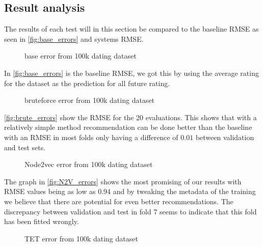 \subsection{Result analysis}
The results of each test will in this section be compared to the baseline RMSE as seen in \autoref{fig:base_errors} and systems RMSE.
\begin{figure}[H]
	\centering
	\begin{adjustbox}{width=0.5\textwidth}
		
	\end{adjustbox}
	\caption{base error from 100k dating dataset }
	\label{fig:base_errors}
\end{figure}

In \autoref{fig:base_errors} is the baseline RMSE, we got this by using the average rating for the dataset as the prediction for all future rating.

\begin{figure}[H]
	\centering
	\begin{adjustbox}{width=0.5\textwidth}
		
	\end{adjustbox}
	\caption{bruteforce error from 100k dating dataset }
	\label{fig:brute_errors}
\end{figure}

\autoref{fig:brute_errors} show the RMSE for the 20 evaluations. This shows that with a relatively simple method recommendation can be done better than the baseline with an RMSE in most folds only having a difference of $0.01$ between validation and test sets.

\begin{figure}[H]
	\centering
	\begin{adjustbox}{width=0.5\textwidth}
		
	\end{adjustbox}
	\caption{Node2vec error from 100k dating dataset }
	\label{fig:N2V_errors}
\end{figure}

The graph in \autoref{fig:N2V_errors} shows the most promising of our results with RMSE values being as low as 0.94 and by tweaking the metadata of the training we believe that there are potential for even better recommendations.
The discrepancy between validation and test in fold 7 seems to indicate that this fold has been fitted wrongly.


\begin{figure}[H]
	\centering
	\begin{adjustbox}{width=0.5\textwidth}
		
	\end{adjustbox}
	\caption{TET error from 100k dating dataset }
	\label{fig:tet_errors}
\end{figure}

